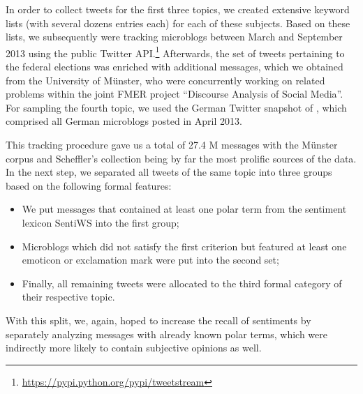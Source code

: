 In order to collect tweets for the first three topics, we created
extensive keyword lists (with several dozens entries each) for each of
these subjects.  Based on these lists, we subsequently were tracking
microblogs between March and September 2013 using the public Twitter
API.\footnote{\url{https://pypi.python.org/pypi/tweetstream}}
Afterwards, the set of tweets pertaining to the federal elections was
enriched with additional messages, which we obtained from the
University of M\"unster, who were concurrently working on related
problems within the joint FMER project ``Discourse Analysis of Social
Media''.  For sampling the fourth topic, we used the German Twitter
snapshot of \citet{Scheffler:14}, which comprised all German
microblogs posted in April 2013.






This tracking procedure gave us a total of 27.4 M messages with the
M\"unster corpus and Scheffler's collection being by far the most
prolific sources of the data.  In the next step, we separated all
tweets of the same topic into three groups based on the following
formal features:
\begin{itemize}
\item We put messages that contained at least one polar term from the
  sentiment lexicon SentiWS \cite{Remus:10} into the first group;
\item Microblogs which did not satisfy the first criterion but
  featured at least one emoticon or exclamation mark were put into the
  second set;
\item Finally, all remaining tweets were allocated to the third formal
  category of their respective topic.
\end{itemize}
With this split, we, again, hoped to increase the recall of sentiments
by separately analyzing messages with already known polar terms, which
were indirectly more likely to contain subjective opinions as well.

